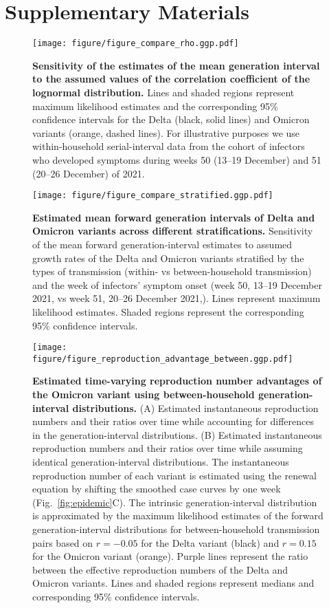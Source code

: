 \documentclass[12pt]{article}
\newcommand{\fref}[1]{Fig.~\ref{fig:#1}}
\begin{document}
\pagebreak

\section*{Supplementary Materials}
\setcounter{figure}{0}
\renewcommand{\thefigure}{S\arabic{figure}}

\begin{figure}[!th]
\texttt{[image: figure/figure\_compare\_rho.ggp.pdf]}
\caption{
\textbf{Sensitivity of the estimates of the mean generation interval to the assumed values of the correlation coefficient of the lognormal distribution.}
Lines and shaded regions represent maximum likelihood estimates and the corresponding 95\% confidence intervals for the Delta (black, solid lines) and Omicron variants (orange, dashed lines).
For illustrative purposes we use within-household serial-interval data from the cohort of infectors who developed symptoms during weeks 50 (13--19 December) and 51 (20--26 December) of 2021.
}
\end{figure}

\pagebreak

\begin{figure}[!th]
\texttt{[image: figure/figure\_compare\_stratified.ggp.pdf]}
\caption{
\textbf{Estimated mean forward generation intervals of Delta and Omicron variants across different stratifications.}
Sensitivity of the mean forward generation-interval estimates to assumed growth rates of the Delta and Omicron variants stratified by the types of transmission (within- vs between-household transmission) and the week of infectors' symptom onset (week 50, 13--19 December 2021, vs week 51, 20--26 December 2021,).
Lines represent maximum likelihood estimates.
Shaded regions represent the corresponding 95\% confidence intervals.
}
\end{figure}


\pagebreak

\begin{figure}[!th]
\texttt{[image: figure/figure\_reproduction\_advantage\_between.ggp.pdf]}
\caption{
\textbf{Estimated time-varying reproduction number advantages of the Omicron variant using between-household generation-interval distributions.}
(A) Estimated instantaneous reproduction numbers and their ratios over time while accounting for differences in the generation-interval distributions.
(B) Estimated instantaneous reproduction numbers and their ratios over time while assuming identical generation-interval distributions.
The instantaneous reproduction number of each variant is estimated using the renewal equation by shifting the smoothed case curves by one week (\fref{epidemic}C).
The intrinsic generation-interval distribution is approximated by the maximum likelihood estimates of the forward generation-interval distributions for between-household transmission pairs based on $r=-0.05$ for the Delta variant (black) and $r=0.15$ for the Omicron variant (orange).
Purple lines represent the ratio between the effective reproduction numbers of the Delta and Omicron variants.
Lines and shaded regions represent medians and corresponding 95\% confidence intervals.
}
\end{figure}

\pagebreak


\end{document}
